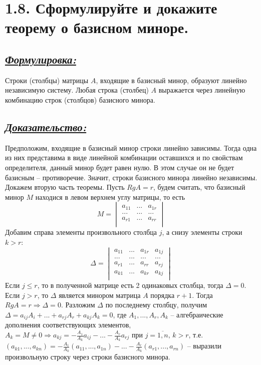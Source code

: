 \documentclass{article}
\begin{document}
\section*{\LARGE 1.8. Сформулируйте и докажите теорему о базисном миноре.}
\subsection*{\Large \underline{\textit{Формулировка: }}}
Строки (столбцы) матрицы $A$, входящие в базисный минор, образуют линейно независимую систему. Любая строка (столбец) $A$ выражается через линейную комбинацию строк (столбцов) базисного минора.

\subsection*{\Large \underline{\textit{Доказательство: }}}
Предположим, входящие в базисный минор строки линейно зависимы. Тогда одна из них представима в виде линейной комбинации оставшихся и по свойствам определителя, данный минор будет равен нулю. В этом случае он не будет базисным -- противоречие. Значит, строки базисного минора линейно независимы.
\newline Докажем вторую часть теоремы. Пусть $RgA = r$, будем считать, что базисный минор $M$ находися в левом верхнем углу матрицы, то есть 
$$
M = 
\begin{vmatrix}
a_{11} & ... & a_{1r} \\
... & ... & ... \\
a_{r1} & ... & a_{rr} \\
\end{vmatrix}
$$
Добавим справа элементы произвольного столбца $j$, а снизу элементы строки $k > r$:
$$
\Delta = 
\begin{vmatrix}
a_{11} & ... & a_{1r} & a_{1j} \\
... & ... & ... & ... \\
a_{r1} & ... & a_{rr} & a_{rj }\\
a_{k1} & ... & a_{kr} & a_{kj }\\
\end{vmatrix}
$$
Если $j \le r$, то в полученной матрице есть 2 одинаковых столбца, тогда $\Delta = 0$.
\newline Если $j > r$, то $\Delta$ является минором матрица $A$ порядка $r + 1$. Тогда $RgA = r \Rightarrow \Delta = 0$. Разложим $\Delta$ по последнему столбцу, получим $\Delta = a_{ij}A_{i} + ... + a_{rj}A_{r} + a_{kj}A_{k} = 0$, где $A_{1}, ..., A_{r}, A_{k}$ -- алгебраические дополнения соответствующих элементов, $A_{k} = M \ne 0 \Rightarrow a_{kj} = -\frac{A_1}{A_k}a_{ij} - ... - \frac{A_r}{A_k}a_{rj}$ при $j = \overline{1, n},\, k > r$, т.е. $(a_{k1}, ..., a_{kn}) = -\frac{A_1}{A_k}(a_{11}, ..., a_{1n}) - ... - \frac{A_r}{A_k}(a_{r1}, ..., a_{rn})$ -- выразили произвольную строку через строки базисного минора.
\end{document}
